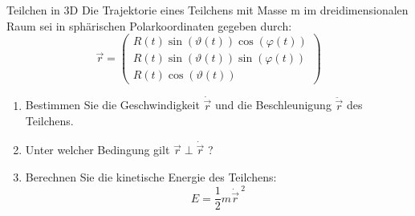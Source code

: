 \newpage
\setcounter{punkte}{10}
\begin{aufgabe}{Teilchen in 3D}
Die Trajektorie eines Teilchens mit Masse m im dreidimensionalen Raum sei in sphärischen
Polarkoordinaten gegeben durch:
\begin{equation}
  \vec{r} =
  \begin{pmatrix}
      R(t) \sin\!\left(\vartheta(t)\right) \cos\!\left(\varphi(t)\right) \\
      R(t) \sin\!\left(\vartheta(t)\right) \sin\!\left(\varphi(t)\right) \\
      R(t) \cos\!\left(\vartheta(t)\right)
  \end{pmatrix}
  \label{eqn:trajektorie}
\end{equation}
\renewcommand{\labelenumi}{\alph{enumi})}
\renewcommand{\labelenumii}{(\roman{enumii})}
\begin{enumerate}
  \item Bestimmen Sie die Geschwindigkeit $\dot{\vec{r}}$ und die Beschleunigung
  $\ddot{\vec{r}}$ des Teilchens.
  \item Unter welcher Bedingung gilt $\vec{r} \perp \dot{\vec{r}}$ ?
  \item Berechnen Sie die kinetische Energie des Teilchens:
  \begin{equation}
    E = \frac{1}{2} m {\dot{\vec{r}}\,}^2
    \label{eqn:ekin}
  \end{equation}
\end{enumerate}
\end{aufgabe}

%
%

